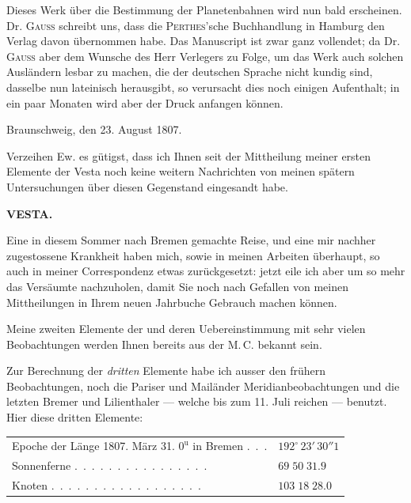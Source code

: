 \expandafter\def\csname HistoricalNoteText27\endcsname{Dieses Werk über die Bestimmung der Planetenbahnen wird nun bald erscheinen. Dr. \textsc{Gauss} schreibt uns, dass die \textsc{Perthes}'sche Buchhandlung in Hamburg den Verlag davon übernommen habe. Das Manuscript ist zwar ganz vollendet; da Dr. \textsc{Gauss} aber dem Wunsche des Herr Verlegers zu Folge, um das Werk auch solchen Ausländern lesbar zu machen, die der deutschen Sprache nicht kundig sind, dasselbe nun lateinisch herausgibt, so verursacht dies noch einigen Aufenthalt; in ein paar Monaten wird aber der Druck anfangen können.}
\par\medskip
{}
\hypertarget{native-289-lower}{}
\begin{flushright}
Braunschweig, den 23. August 1807.
\end{flushright}

\par\indent Verzeihen Ew. es gütigst, dass ich Ihnen seit der Mittheilung meiner ersten Elemente der Vesta
noch keine weitern Nachrichten von meinen spätern Untersuchungen über diesen Gegenstand eingesandt habe.
\clearpage
\thispagestyle{empty}
\noindent{}%
\makebox[12mm][l]{}%
\parbox[t]{\dimexpr\linewidth-24mm\relax}{\centering\footnotesize\bfseries VESTA.\par}%
\par\nobreak\medskip
\noindent Eine in diesem Sommer nach Bremen gemachte Reise, und eine mir nachher zugestossene Krankheit haben mich, sowie in meinen Arbeiten überhaupt, so auch in meiner Correspondenz etwas zurückgesetzt: jetzt eile ich aber um so mehr das Versäumte nachzuholen, damit Sie noch nach Gefallen von meinen Mittheilungen in Ihrem neuen Jahrbuche Gebrauch machen können.

\par\indent Meine zweiten Elemente der \VestaBodyTwoNinety{} und deren Uebereinstimmung mit sehr vielen Beobachtungen werden Ihnen bereits aus der M.\,C. bekannt sein.

\par\indent Zur Berechnung der \emph{dritten} Elemente habe ich ausser den frühern Beobachtungen, noch die Pariser und Mailänder Meridianbeobachtungen und die letzten Bremer und Lilienthaler --- welche bis zum 11. Juli reichen --- benutzt. Hier diese dritten Elemente:

\begin{center}\begingroup\fontsize{9}{11}\selectfont
\begin{tabular}{ll}
\shortstack[l]{Epoche der Länge 1807. März 31.\\$0^{\text{u}}$ in Bremen} .\ .\ . & $192^\circ\,23'\,30''1$ \\
Sonnenferne .\ .\ .\ .\ .\ .\ .\ .\ .\ .\ .\ .\ .\ .\ .\ . & $69\;50\;31.9$ \\
Knoten .\ .\ .\ .\ .\ .\ .\ .\ .\ .\ .\ .\ .\ .\ .\ .\ .\ . & $103\;18\;28.0$
\end{tabular}\endgroup\end{center}

